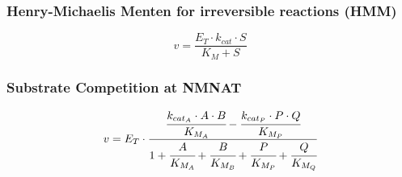 \documentclass[a4paper,10pt]{article}
\begin{document}
\subsubsection*{Henry-Michaelis Menten for irreversible reactions (HMM)}
\begin{equation}
v=\frac{E_T\cdot k_{cat}\cdot S}{K_M + S}
\end{equation}


\subsubsection*{Substrate Competition at NMNAT}
\begin{equation}
v=E_T \cdot \cfrac{\cfrac{k_{{cat}_{A}}\cdot A \cdot
B}{K_{{M}_A}}-\cfrac{k_{{cat}_{P}}\cdot P \cdot
Q}{K_{{M}_P}}}{1+\cfrac{A}{K_{{M}_A}}+\cfrac{B}{K_{{M}_B}}+\cfrac{P}{K_{{M}_P}}+\cfrac{Q}{K_{{M}_Q}}}
\end{equation}





\end{document}
